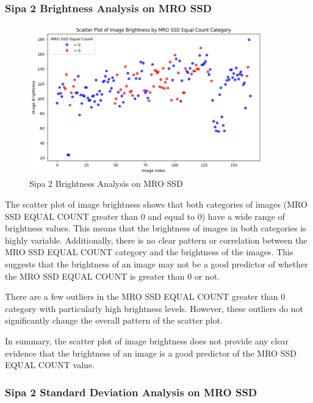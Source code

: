 \subsubsection{Sipa 2 Brightness Analysis on MRO SSD}


\begin{figure}[ht]
    \centering
    \includegraphics[width=0.9\textwidth]{Figures/Results/sipa_02/brightness.png}
    \caption[Sipa 2 Brightness Analysis on MRO SSD]{Sipa 2 Brightness Analysis on MRO SSD}
    \label{fig:Sipa 2 Brightness Analysis on MRO SSD}
\end{figure}



The scatter plot of image brightness shows that both categories of images (MRO SSD EQUAL COUNT greater than 0 and equal to 0) have a wide range of brightness values. This means that the brightness of images in both categories is highly variable. Additionally, there is no clear pattern or correlation between the MRO SSD EQUAL COUNT category and the brightness of the images. This suggests that the brightness of an image may not be a good predictor of whether the MRO SSD EQUAL COUNT is greater than 0 or not.

There are a few outliers in the MRO SSD EQUAL COUNT greater than 0 category with particularly high brightness levels. However, these outliers do not significantly change the overall pattern of the scatter plot.

In summary, the scatter plot of image brightness does not provide any clear evidence that the brightness of an image is a good predictor of the MRO SSD EQUAL COUNT value.

\newpage

\subsubsection{Sipa 2 Standard Deviation Analysis on MRO SSD}


